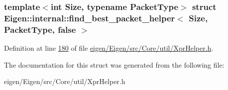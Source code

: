 \subsubsection*{template$<$int Size, typename Packet\+Type$>$\newline
struct Eigen\+::internal\+::find\+\_\+best\+\_\+packet\+\_\+helper$<$ Size, Packet\+Type, false $>$}



Definition at line \hyperlink{eigen_2_eigen_2src_2_core_2util_2_xpr_helper_8h_source_l00180}{180} of file \hyperlink{eigen_2_eigen_2src_2_core_2util_2_xpr_helper_8h_source}{eigen/\+Eigen/src/\+Core/util/\+Xpr\+Helper.\+h}.



The documentation for this struct was generated from the following file\+:\begin{DoxyCompactItemize}
\item 
eigen/\+Eigen/src/\+Core/util/\+Xpr\+Helper.\+h\end{DoxyCompactItemize}
